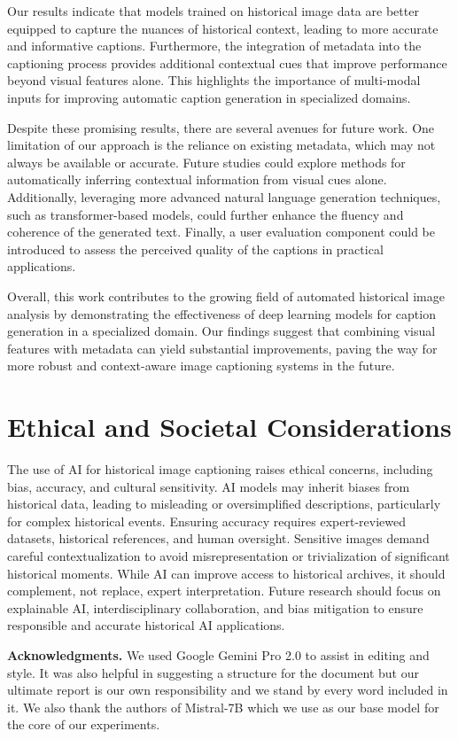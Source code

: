 \documentclass[10pt,twocolumn,letterpaper]{article}
\begin{document}
Our results indicate that models trained on historical image data are better equipped to capture the nuances of historical context, leading to more accurate and informative captions. Furthermore, the integration of metadata into the captioning process provides additional contextual cues that improve performance beyond visual features alone. This highlights the importance of multi-modal inputs for improving automatic caption generation in specialized domains.

Despite these promising results, there are several avenues for future work. One limitation of our approach is the reliance on existing metadata, which may not always be available or accurate. Future studies could explore methods for automatically inferring contextual information from visual cues alone. Additionally, leveraging more advanced natural language generation techniques, such as transformer-based models, could further enhance the fluency and coherence of the generated text. Finally, a user evaluation component could be introduced to assess the perceived quality of the captions in practical applications.

Overall, this work contributes to the growing field of automated historical image analysis by demonstrating the effectiveness of deep learning models for caption generation in a specialized domain. Our findings suggest that combining visual features with metadata can yield substantial improvements, paving the way for more robust and context-aware image captioning systems in the future.

\section{Ethical and Societal Considerations} The use of AI for historical image captioning raises ethical concerns, including bias, accuracy, and cultural sensitivity. AI models may inherit biases from historical data, leading to misleading or oversimplified descriptions, particularly for complex historical events. Ensuring accuracy requires expert-reviewed datasets, historical references, and human oversight. Sensitive images demand careful contextualization to avoid misrepresentation or trivialization of significant historical moments. While AI can improve access to historical archives, it should complement, not replace, expert interpretation. Future research should focus on explainable AI, interdisciplinary collaboration, and bias mitigation to ensure responsible and accurate historical AI applications.

\noindent
{\bf Acknowledgments. } We used Google Gemini Pro 2.0 to assist in editing and style. It was also helpful in suggesting a structure for the document but our ultimate report is our own responsibility and we stand by every word included in it. We also thank the authors of Mistral-7B which we use as our base model for the core of our experiments.





{\small


}
\end{document}
